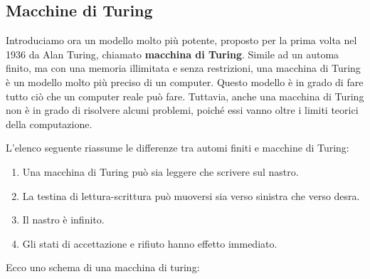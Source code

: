 \documentclass{article}
\begin{document}
\subsection{Macchine di Turing}

Introduciamo ora un modello molto più potente, proposto per la prima volta nel
1936 da Alan Turing, chiamato \textbf{macchina di Turing}. Simile ad un automa
finito, ma con una memoria illimitata e senza restrizioni, una macchina di
Turing è un modello molto più preciso di un computer. Questo modello è in grado
di fare tutto ciò che un computer reale può fare. Tuttavia, anche una macchina
di Turing non è in grado di risolvere alcuni problemi, poiché essi vanno oltre i
limiti teorici della computazione.

L'elenco seguente riassume le differenze tra automi finiti e macchine di Turing:

\begin{enumerate}
    \item Una macchina di Turing può sia leggere che scrivere sul nastro.
    \item La testina di lettura-scrittura può muoversi sia verso sinistra che
    verso desra.
    \item Il nastro è infinito.
    \item Gli stati di accettazione e rifiuto hanno effetto immediato.
\end{enumerate}

Ecco uno schema di una macchina di turing:
\end{document}
